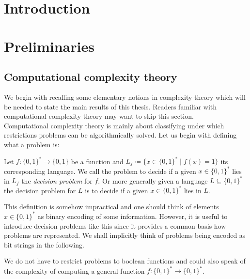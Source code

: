 \section*{Introduction}

\newpage

\section{Preliminaries}
\subsection{Computational complexity theory}
We begin with recalling some elementary notions in complexity theory which will be needed to state the main results of this thesis.
Readers familiar with computational complexity theory may want to skip this section.
\\

Computational complexity theory is mainly about classifying under which restrictions problems can be algorithmically solved.
Let us begin with defining what a problem is:

\begin{Definition}
 Let $f \colon {\lbrace 0,1 \rbrace}^* \to {\lbrace 0,1 \rbrace}$ be a function and $L_f \coloneqq {\lbrace 
 x \in {\lbrace 0,1 \rbrace}^*  \; | \; f(x) = 1 \rbrace} $ its corresponding language. We call the 
 problem to decide if a given $x \in {\lbrace 0,1 \rbrace}^*$ lies in $L_f$ the \emph{decision problem} for $f$.
 Or more generally given a language $L \subseteq {\lbrace 0,1 \rbrace}^*$ the decision problem for $L$ is to decide
 if a given $x \in {\lbrace 0,1 \rbrace}^* $ lies in $L$.
\end{Definition}

\begin{Remark}
This definition is somehow impractical and one should think of elements $x \in {\lbrace 0,1 \rbrace}^*$ as binary encoding
of some information. However, it is useful to introduce decision problems like this since it provides a common basis how problems
are represented. We shall implicitly think of problems being encoded as bit strings in the following.
\end{Remark}

\begin{Remark}
 We do not have to restrict problems to boolean functions and could also speak of the complexity of
 computing a general function $f \colon {\lbrace 0,1 \rbrace}^* \to {\lbrace 0,1 \rbrace}^*$. 
\end{Remark}



